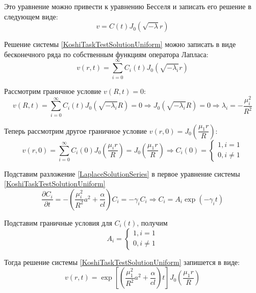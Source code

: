 \documentclass[a4paper,12pt,russian, fleqn]{extreport}
\begin{document}
	Это уравнение можно привести к уравнению Бесселя и записать его решение в следующем виде:
	\begin{equation*}
		v = C(t)J_0\left( \sqrt{-\lambda}r \right)
	\end{equation*}
	
	Решение системы \eqref{KoshiTaskTestSolutionUniform} можно записать в виде бесконечного ряда по собственным функциям оператора Лапласа:
	\begin{equation}\label{LaplaceSolutionSeries}
		v(r,t) = \sum\limits^{\infty}_{i=0} C_i(t)J_0\left(\sqrt{-\lambda_i}r\right)
	\end{equation}
	
	Рассмотрим граничное условие $v(R,t) = 0$:
	\begin{equation*}
		v(R,t) = \sum\limits^{\infty}_{i=0} C_i(t)J_0\left(\sqrt{-\lambda_i}R\right) = 0 \Rightarrow J_0\left(\sqrt{-\lambda_i}R\right) = 0 \Rightarrow \lambda_i = -\dfrac{\mu_i^2}{R^2}
	\end{equation*}
	
	Теперь рассмотрим другое граничное условие $v(r,0) = J_0\left(\dfrac{\mu_1 r}{R}\right)$:
	\begin{equation*}
		v(r,0) = \sum\limits^{\infty}_{i=0} C_i(0)J_0\left(\dfrac{\mu_i r}{R}\right) = J_0\left(\dfrac{\mu_1 r}{R}\right) \Rightarrow C_i(0) = \left\{\begin{array}{c}
			1, i = 1 \\
			0, i \ne 1
		\end{array}\right.
	\end{equation*}
	
	Подставим разложение \eqref{LaplaceSolutionSeries} в первое уравнение системы \eqref{KoshiTaskTestSolutionUniform}
	\begin{equation*}\label{key}
	\dfrac{\partial C_i}{\partial t} = - \left ( \dfrac{\mu_i^2}{R^2}a^2 + \dfrac{\alpha}{cl} \right) C_i = -\gamma_i C_i \Rightarrow C_i = A_i \exp{\left( -\gamma_i t \right)}
	\end{equation*}
	
	Подставим граничные условия для $C_i(t)$, получим
	\begin{equation*}
		A_i = \left\{\begin{array}{c}
		1, i = 1 \\
		0, i \ne 1
		\end{array}\right.
	\end{equation*}
	
	Тогда решение системы \eqref{KoshiTaskTestSolutionUniform} запишется в виде:
	\begin{equation*}
		v(r,t) = \exp{\left[ \left ( \dfrac{\mu_1^2}{R^2}a^2 + \dfrac{\alpha}{cl} \right)t \right]}J_0 \left( \dfrac{\mu_1 r}{R}\right)
	\end{equation*}
	
\end{document}
